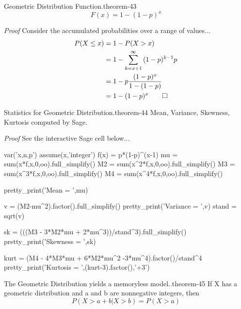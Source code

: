 \documentclass[10pt,]{book}
\makeatletter
\renewcommand*{\proofname}{Proof}
\renewenvironment{proof}[1][\proofname]{\par
  \pushQED{\qed}%
  \normalfont \topsep6\p@\@plus6\p@\relax
  \trivlist
  \item\relax
    {\itshape
    #1\@addpunct{.}}\hspace\labelsep\ignorespaces
}{%
  \popQED\endtrivlist\@endpefalse
}
\numberwithin{equation}{section}
\newcommand{\gt}{>}
\makeatother
\begin{document}
%
\par
\hypertarget{p-955}{}%
\begin{theorem}{Geometric Distribution Function.}{}{theorem-43}%
\hypertarget{p-956}{}%
%
\begin{equation*}
F(x) =  1- (1-p)^{x}
\end{equation*}
%
\end{theorem}
\begin{proof}\hypertarget{proof-46}{}
\hypertarget{p-957}{}%
Consider the accumulated probabilities over a range of values...%
\begin{align*}
P(X \le x) & = 1 - P(X \gt x)\\
& = 1- \sum_{k={x+1}}^{\infty} {(1-p)^{k-1}p}\\
& = 1- p \frac{(1-p)^{x}}{1-(1-p)}\\
& = 1- (1-p)^{x}\qedhere
\end{align*}
%
\end{proof}
%
\par
\hypertarget{p-958}{}%
\begin{theorem}{Statistics for Geometric Distribution.}{}{theorem-44}%
\hypertarget{p-959}{}%
Mean, Variance, Skewness, Kurtosis computed by Sage.%
\end{theorem}
\begin{proof}\hypertarget{proof-47}{}
\hypertarget{p-960}{}%
See the interactive Sage cell below...%
\end{proof}
 \begin{sageinput}
var('x,n,p')
assume(x,'integer')
f(x) = p*(1-p)^(x-1)
mu = sum(x*f,x,0,oo).full_simplify()
M2 = sum(x^2*f,x,0,oo).full_simplify()
M3 = sum(x^3*f,x,0,oo).full_simplify()
M4 = sum(x^4*f,x,0,oo).full_simplify()

pretty_print('Mean = ',mu)

v = (M2-mu^2).factor().full_simplify()
pretty_print('Variance = ',v)
stand = sqrt(v)

sk = (((M3 - 3*M2*mu + 2*mu^3))/stand^3).full_simplify()
pretty_print('Skewness = ',sk)

kurt = (M4 - 4*M3*mu + 6*M2*mu^2 -3*mu^4).factor()/stand^4
pretty_print('Kurtosis = ',(kurt-3).factor(),'+3')
\end{sageinput}
%
\par
\hypertarget{p-961}{}%
\begin{theorem}{The Geometric Distribution yields a memoryless model..}{}{theorem-45}%
\hypertarget{p-962}{}%
If X has a geometric distribution and a and b are nonnegative integers, then%
\begin{equation*}
P( X > a + b | X > b ) = P( X > a)
\end{equation*}
%
\end{theorem}
\end{document}

